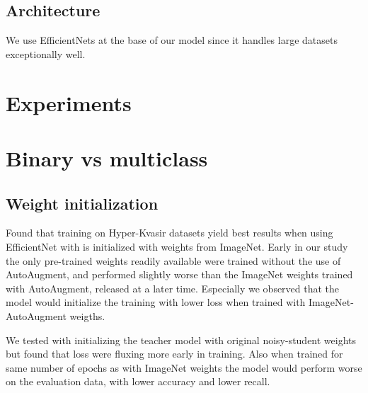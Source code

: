 \documentclass[thesis.tex]{subfiles}
\begin{document}
\subsection{Architecture}
We use EfficientNets at the base of our model since it handles large datasets exceptionally well. 




\section{Experiments}
%


\section{Binary vs multiclass}



\subsection{Weight initialization}
Found that training on Hyper-Kvasir datasets yield best results when using EfficientNet with is initialized with weights from ImageNet. Early in our study the only pre-trained weights readily available were trained without the use of AutoAugment, and performed slightly worse than the ImageNet weights trained with AutoAugment, released at a later time. Especially we observed that the model would initialize the training with lower loss when trained with ImageNet-AutoAugment weigths.


We tested with initializing the teacher model with original noisy-student weights but found that loss were fluxing more early in training. Also when trained for same number of epochs as with ImageNet weights the model would perform worse on the evaluation data, with lower accuracy and lower recall.
\end{document}
